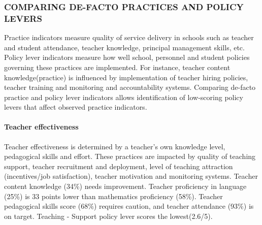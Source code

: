 \documentclass[twocolumn]{article}
\let\oldparagraph\paragraph
\renewcommand{\paragraph}[1]{\oldparagraph{#1}\mbox{}}
\begin{document}
\hypertarget{comparing-de-facto-practices-and-policy-levers}{%
\subsubsection{\texorpdfstring{\textbf{COMPARING DE-FACTO PRACTICES AND
POLICY
LEVERS}}{COMPARING DE-FACTO PRACTICES AND POLICY LEVERS}}\label{comparing-de-facto-practices-and-policy-levers}}

Practice indicators measure quality of service delivery in schools such
as teacher and student attendance, teacher knowledge, principal
management skills, etc. Policy lever indicators measure how well school,
personnel and student policies governing these practices are
implemented. For instance, teacher content knowledge(practice) is
influenced by implementation of teacher hiring policies, teacher
training and monitoring and accountability systems. Comparing de-facto
practice and policy lever indicators allows identification of
low-scoring policy levers that affect observed practice indicators.

\hypertarget{teacher-effectiveness}{%
\paragraph{\texorpdfstring{\textbf{Teacher
effectiveness}}{Teacher effectiveness}}\label{teacher-effectiveness}}

Teacher effectiveness is determined by a teacher's own knowledge level,
pedagogical skills and effort. These practices are impacted by quality
of teaching support, teacher recruitment and deployment, level of
teaching attraction (incentives/job satisfaction), teacher motivation
and monitoring systems. Teacher content knowledge (34\%) needs
improvement. Teacher proficiency in language (25\%) is 33 points lower
than mathematics proficiency (58\%). Teacher pedagogical skills score
(68\%) requires caution, and teacher attendance (93\%) is on target.
Teaching - Support policy lever scores the lowest(2.6/5).
\end{document}
